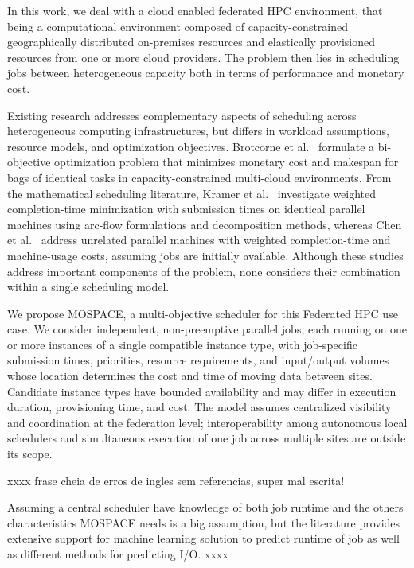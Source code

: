 \documentclass[conference]{IEEEtran}
\begin{document}
In this work, we deal with a cloud enabled federated HPC environment, that being a computational environment composed of capacity-constrained geographically distributed on-premises resources and elastically provisioned resources from one or more cloud providers. The problem then lies in scheduling jobs between heterogeneous capacity both in terms of performance and monetary cost.

Existing research addresses complementary aspects of scheduling across heterogeneous computing infrastructures, but differs in workload assumptions, resource models, and optimization objectives. Brotcorne et al.~\cite{Brotcorne2023} formulate a bi-objective optimization problem that minimizes monetary cost and makespan for bags of identical tasks in capacity-constrained multi-cloud environments. From the mathematical scheduling literature, Kramer et al.~\cite{Kramer2020} investigate weighted completion-time minimization with submission times on identical parallel machines using arc-flow formulations and decomposition methods, whereas Chen et al.~\cite{Chen2024} address unrelated parallel machines with weighted completion-time and machine-usage costs, assuming jobs are initially available. Although these studies address important components of the problem, none considers their combination within a single scheduling model.

We propose MOSPACE, a multi-objective scheduler for this Federated HPC use case. We consider independent, non-preemptive parallel jobs, each running on one or more instances of a single compatible instance type, with job-specific submission times, priorities, resource requirements, and input/output volumes whose location determines the cost and time of moving data between sites. Candidate instance types have bounded availability and may differ in execution duration, provisioning time, and cost. The model assumes centralized visibility and coordination at the federation level; interoperability among autonomous local schedulers and simultaneous execution of one job across multiple sites are outside its scope.

xxxx frase cheia de erros de ingles sem referencias, super mal escrita!

Assuming a central scheduler have knowledge of both job runtime and the others characteristics MOSPACE needs is a big assumption, but the literature provides extensive support for machine learning solution to predict runtime of job\cite{Nunes2025} as well as different methods for predicting I/O. 
xxxx
\end{document}
